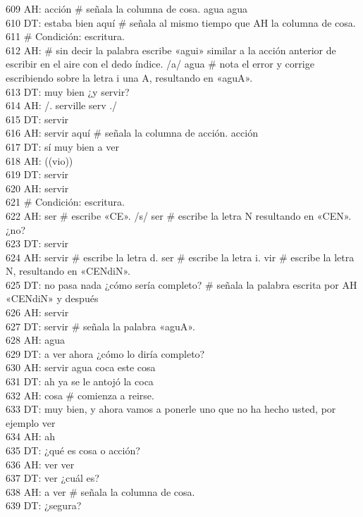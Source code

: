 609 AH: acción # señala la columna de cosa. agua agua\\
610 DT: estaba bien aquí # señala al mismo tiempo que AH la columna de cosa.\\
611 # Condición: escritura.\\
612 AH: # sin decir la palabra escribe «agui» similar a la acción anterior de escribir en el aire con el dedo índice. /a/ agua # nota el error y corrige escribiendo sobre la letra i una A, resultando en «aguA».\\
613 DT: muy bien ¿y servir?\\
614 AH: /. serville serv ./ \\
615 DT: servir\\
616 AH: servir aquí # señala la columna de acción. acción\\
617 DT: sí muy bien a ver\\
618 AH: ((vio))\\
619 DT: servir\\
620 AH: servir\\
621 # Condición: escritura.\\
622 AH: ser # escribe «CE». /s/ ser # escribe la letra N resultando en «CEN». ¿no?\\
623 DT: servir\\
624 AH: servir # escribe la letra d. ser # escribe la letra i. vir # escribe la letra N, resultando en «CENdiN».\\
625 DT: no pasa nada ¿cómo sería completo? # señala la palabra escrita por AH «CENdiN» y después\\
626 AH: servir\\
627 DT: servir # señala la palabra «aguA».\\
628 AH: agua\\
629 DT: a ver ahora ¿cómo lo diría completo?\\
630 AH: servir agua coca este cosa\\
631 DT: ah ya se le antojó la coca\\
632 AH: cosa # comienza a reirse.\\
633 DT: muy bien, y ahora vamos a ponerle uno que no ha hecho usted, por ejemplo ver\\
634 AH: ah\\
635 DT: ¿qué es cosa o acción?\\
636 AH: ver ver\\
637 DT: ver ¿cuál es?\\
638 AH: a ver # señala la columna de cosa.\\
639 DT: ¿segura?\\
